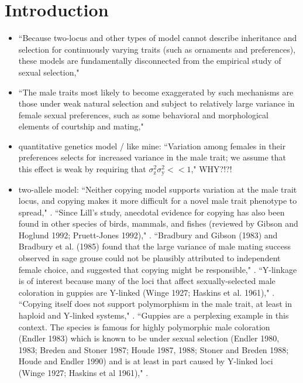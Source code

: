 \documentclass{article}
\newcommand{\x}[1]{\text{#1}}
\begin{document}
\tableofcontents
\section{Introduction}
\begin{itemize}
\item ``Because two-locus and other types of model cannot describe inheritance and selection for continuously varying traits (such as ornaments and preferences), these models are fundamentally disconnected from the empirical study of sexual selection," \cite{Mead:2004uq}

\item ``The male traits most likely to become exaggerated by such mechanisms are those under weak natural selection and subject to relatively large variance in female sexual preferences, such as some behavioral and morphological elements of courtship and mating," \cite{Lande:1981fk}

\item quantitative genetics model / like mine: ``Variation among females in their preferences selects for increased variance in the male trait; we assume that this effect is weak by requiring that $\sigma_\x{z}^2\sigma_\x{y}^2<<1$," \cite{Kirkpatrick:1990kx} WHY?!?!

\item two-allele model: ``Neither copying model supports variation at the male trait locus, and copying makes it more difficult for a novel male trait phenotype to spread," \cite{Kirkpatrick:1994vn}. ``Since Lill's study, anecdotal evidence for copying has also been found in other species of birds, mammals, and fishes (reviewed by Gibson and Hoglund 1992; Pruett-Jones 1992)," \cite{Kirkpatrick:1994vn}. ``Bradbury and Gibson (1983) and Bradbury et al. (1985) found that the large variance of male mating success observed in sage grouse could not be plausibly attributed to independent female choice, and suggested that copying might be responsible," \cite{Kirkpatrick:1994vn}. ``Y-linkage is of interest because many of the loci that affect sexually-selected male coloration in guppies are Y-linked (Winge 1927; Haskins et al. 1961)," \cite{Kirkpatrick:1994vn}. ``Copying itself does not support polymorphism in the male trait, at least in haploid and Y-linked systems," \cite{Kirkpatrick:1994vn}. ``Guppies are a perplexing example in this context. The species is famous for highly polymorphic male coloration (Endler 1983) which is known to be under sexual selection (Endler 1980, 1983; Breden and Stoner 1987; Houde 1987, 1988; Stoner and Breden 1988; Houde and Endler 1990) and is at least in part caused by Y-linked loci (Winge 1927; Haskins et al 1961)," \cite{Kirkpatrick:1994vn}.


\end{itemize}
\end{document}
